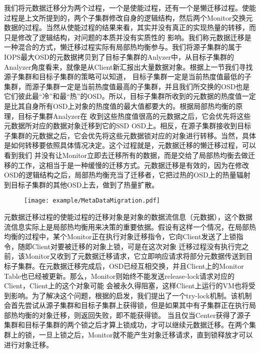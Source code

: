 我们将元数据迁移分为两个过程，一个是使能过程，还有一个是懒迁移过程。使能过程是上文所提到的，两个子集群修改自身的逻辑结构，然后两个Monitor交换元数据的过程。当然从使能过程的结果来看，其实并没有真正的实现热量的转移，而只是修改了逻辑结构，对问题的本质并没有实质性的
影响。我们称元数据迁移是一种混合的方式，懒迁移过程实际有局部热均衡参与。我们将源子集群的属于IOPS最大OSD的元数据拷贝到了目标子集群的Anlyzer中，从目标子集群的Analyzer角度看来，就像是从Client新汇报出大量数据对象。根据上一节我们寻找源子集群和目标子集群的策略可以知道，
目标子集群一定是当前热度值最低的子集群，而源子集群一定是当前热度值最高的子集群，并且我们所交换的OSD也是它们彼此最“冷”和最“热”的OSD。所以，目标子集群所收到的元数据的热度值一定是比其自身所有OSD上对象的热度值的最大值都要大的。根据局部热均衡的原理，目标子集群Analyzer在
收到这些热度值很高的元数据之后，它会优先将这些元数据所对应的数据对象迁移到它的SSD OSD上。相反，在源子集群接收到目标子集群的元数据之后，它会优先将这些元数据锁对应的对象进行转移。当然，具体是如何转移要依照具体情况决定。这个过程就是，元数据迁移的懒迁移过程，可以看到我们
并没有让Monitor立即去迁移所有的数据，而是交给了局部热均衡去做迁移的工作，这相当于是一种缓慢的迁移方式。元数据迁移是有效的，因为在修改OSD的逻辑结构之后，局部热均衡充当了迁移者，它把过热的OSD上的热量辐射到目标子集群的其他OSD上去，做到了热量扩散。

\begin{figure}[!htp]
    \centering
    \texttt{[image: example/MetaDataMigration.pdf]}
\end{figure}

元数据迁移过程的使能过程的迁移对象是对象的数据流信息（元数据），这个数据流信息实际上是局部热均衡用来决策的重要依据。假设有这样一个情况，在局部热均衡的过程中，某个Monitor正在执行对象迁移指令，它向Client发送了上锁指令，随即Client对要被迁移的对象上锁，可是在这次对象
迁移过程没有执行完之前，该Monitor又收到了元数据迁移请求，它立即响应请求将部分元数据传送到目标子集群。在元数据迁移完成后，OSD已经互相交换，并且Client上的Monitor Table也已经被更新。那么，Monitor则始终不能发送release-lock请求对应的Client，Client上的这个对象可能
会被永久得阻塞，这样Client上运行的VM也将受到影响。为了解决这个问题，根据的启发，我们提出了一个try-lock机制。该机制会首先尝试从源子集群和目标子集群上获得锁，但是如果其中有子集群正在执行局部热均衡的对象迁移，则返回失败，即不能获得锁。
当且仅当Center获得了源子集群和目标子集群的两个锁之后才算上锁成功，才可以继续元数据迁移。在两个集群上的锁，一旦上锁之后，Monitor就不能产生对象迁移请求，直到锁释放才可以进行对象迁移。

